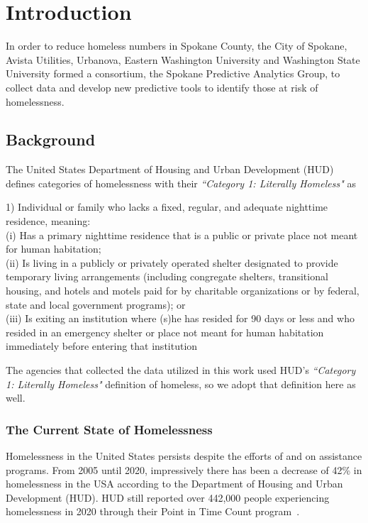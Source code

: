 \documentclass[10pt,letterpaper]{article}
\newcommand{\red}[1]{{\color{red}{#1}}}
\begin{document}
\section*{Introduction}
In order to reduce homeless numbers in Spokane County, the City of Spokane, Avista Utilities, Urbanova, Eastern Washington University and Washington State University formed a consortium, the Spokane Predictive Analytics Group, to collect data and develop new predictive tools to identify those at risk of homelessness.

\subsection*{Background}
The United States Department of Housing and Urban Development (HUD) defines categories of homelessness with their \textit{``Category 1: Literally Homeless"} as
\begin{displayquote}
1) Individual or family who lacks a fixed, regular, and adequate nighttime residence, meaning: \\
(i) Has a primary nighttime residence that is a public or private place not meant for human habitation; \\
(ii) Is living in a publicly or privately operated shelter designated to provide temporary living arrangements (including congregate shelters, transitional housing, and hotels and motels paid for by charitable organizations or by federal, state and local government programs); or \\
(iii) Is exiting an institution where (s)he has resided for 90 days or less and who resided in an emergency shelter or place not meant for human habitation immediately before entering that institution
\end{displayquote}

The agencies that collected the data utilized in this work used HUD's \textit{``Category 1: Literally Homeless"} definition of homeless, so we adopt that definition here as well.

\subsubsection*{The Current State of Homelessness}
Homelessness in the United States persists despite the efforts of \red{PROGRAMS} and \red{MONEY, MONEY spent each year} on assistance programs.  From 2005 until 2020, impressively there has been a decrease of 42\% in homelessness in the USA according to the Department of Housing and Urban Development (HUD). HUD still reported over 442,000 people experiencing homelessness in 2020 through their Point in Time Count program~\cite{PITcount}.
\end{document}
